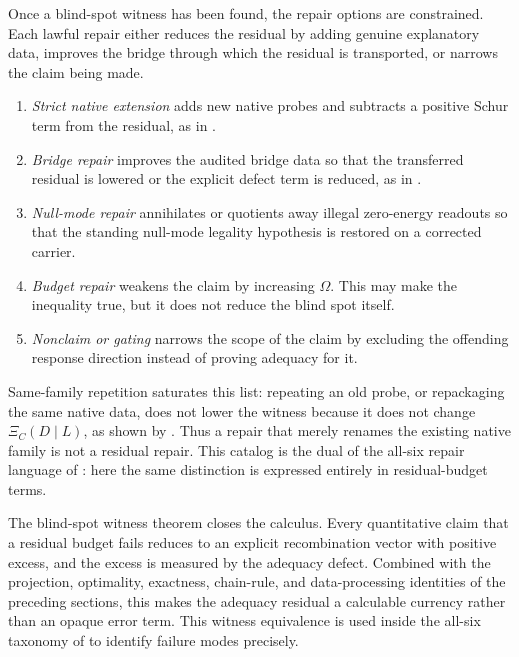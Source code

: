 \documentclass[11pt]{article}
\theoremstyle{definition}
\begin{document}
Once a blind-spot witness has been found, the repair options are constrained.
Each lawful repair either reduces the residual by adding genuine explanatory
data, improves the bridge through which the residual is transported, or narrows
the claim being made.
\begin{enumerate}[label=(\alph*)]
  \item \emph{Strict native extension} adds new native probes and subtracts a
  positive Schur term from the residual, as in
  .

  \item \emph{Bridge repair} improves the audited bridge data so that the
  transferred residual is lowered or the explicit defect term is reduced, as
  in .

  \item \emph{Null-mode repair} annihilates or quotients away illegal
  zero-energy readouts so that the standing null-mode legality hypothesis is
  restored on a corrected carrier.

  \item \emph{Budget repair} weakens the claim by increasing \(\Omega\).  This
  may make the inequality true, but it does not reduce the blind spot itself.

  \item \emph{Nonclaim or gating} narrows the scope of the claim by excluding
  the offending response direction instead of proving adequacy for it.
\end{enumerate}
Same-family repetition saturates this list: repeating an old probe, or
repackaging the same native data, does not lower the witness because it does
not change \(\Xi_C(D\mid L)\), as shown by
.  Thus a repair that merely renames the
existing native family is not a residual repair.  This catalog is the dual of
the all-six repair language of \citet{Tsiokos2026NeedleKiller}: here the same
distinction is expressed entirely in residual-budget terms.

The blind-spot witness theorem closes the calculus.  Every quantitative claim
that a residual budget fails reduces to an explicit recombination vector with
positive excess, and the excess is measured by the adequacy defect.  Combined
with the projection, optimality, exactness, chain-rule, and data-processing
identities of the preceding sections, this makes the adequacy residual a
calculable currency rather than an opaque error term.  This witness equivalence
is used inside the all-six taxonomy of \citet{Tsiokos2026NeedleKiller} to
identify failure modes precisely.
 
\end{document}
